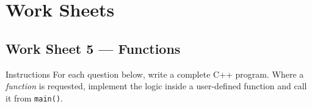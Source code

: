 \chapter{Work Sheets}
\label{ch:worksheets}

\section{Work Sheet 5 --- Functions}
\label{ws:functions}

\begin{importantbox}{Instructions}
For each question below, write a complete C++ program.  Where a
\emph{function} is requested, implement the logic inside a
user-defined function and call it from \texttt{main()}.
\end{importantbox}

